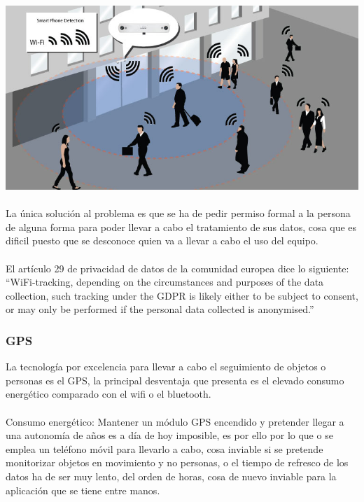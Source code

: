 \documentclass[a4paper ,12pt, onecolumn]{article}
\begin{document}
        \paragraph{}
        \includegraphics[scale=0.4]{WifiCounting.jpg}
        \paragraph{}
        La única solución al problema es que se ha de pedir permiso formal a la persona de alguna forma para poder llevar a cabo
        el tratamiento de sus datos, cosa que es dificil puesto que se desconoce quien va a llevar a cabo el uso del equipo.
        \paragraph{}
        El artículo 29 de privacidad de datos de la comunidad europea dice lo siguiente:
        “WiFi-tracking, depending on the circumstances and purposes of the data collection, such tracking under the GDPR is likely
        either to be subject to consent, or may only be performed if the personal data collected is anonymised.”
        \subsubsection {GPS}
        La tecnología por excelencia para llevar a cabo el seguimiento de objetos o personas es el GPS, la principal desventaja
        que presenta es el elevado consumo energético comparado con el wifi o el bluetooth.
        \paragraph{}
        Consumo energético: Mantener un módulo GPS encendido y pretender llegar a una autonomía de años es a día de hoy
        imposible, es por ello por lo que o se emplea un teléfono móvil para llevarlo a cabo, cosa inviable si se pretende 
        monitorizar objetos en movimiento y no personas, o el tiempo de refresco de los datos ha de ser muy lento, del orden de horas,
        cosa de nuevo inviable para la aplicación que se tiene entre manos.
\end{document}

